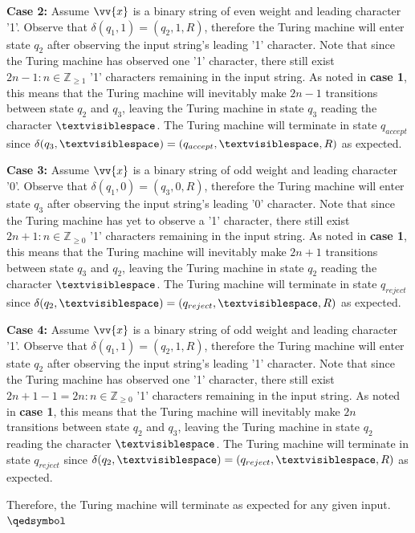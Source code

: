 \documentclass{article}
\begin{document}
\begin{prf}
\begin{adjustwidth}{0.5cm}{}
\end{adjustwidth}
\begin{adjustwidth}{0.5cm}{}
	\textbf{Case 2:} Assume $\vv{x}$ is a binary string of even weight and leading character '1'.  Observe that $\delta(q_{1}, 1) = (q_{2}, 1, R)$, therefore the Turing machine will enter state $q_{2}$ after observing the input string's leading '1' character.  Note that since the Turing machine has observed one '1' character, there still exist $2n - 1 : n \in \mathbb{Z}_{\geq 1}$ '1' characters remaining in the input string.  As noted in \textbf{case 1}, this means that the Turing machine will inevitably make $2n - 1$ transitions between state $q_{2}$ and $q_{3}$, leaving the Turing machine in state $q_{3}$ reading the character $\textvisiblespace$.  The Turing machine will terminate in state $q_{accept}$ since $\delta(q_{3}, \textvisiblespace) = (q_{accept}, \textvisiblespace, R)$ as expected.\\
\end{adjustwidth}
\begin{adjustwidth}{0.5cm}{}
	\textbf{Case 3:} Assume $\vv{x}$ is a binary string of odd weight and leading character '0'.  Observe that $\delta(q_{1}, 0) = (q_{3}, 0, R)$, therefore the Turing machine will enter state $q_{3}$ after observing the input string's leading '0' character.  Note that since the Turing machine has yet to observe a '1' character, there still exist $2n + 1 : n \in \mathbb{Z}_{\geq 0}$ '1' characters remaining in the input string.  As noted in \textbf{case 1}, this means that the Turing machine will inevitably make $2n + 1$ transitions between state $q_{3}$ and $q_{2}$, leaving the Turing machine in state $q_{2}$ reading the character $\textvisiblespace$.  The Turing machine will terminate in state $q_{reject}$ since $\delta(q_{2}, \textvisiblespace) = (q_{reject}, \textvisiblespace, R)$ as expected.\\
\end{adjustwidth}
\begin{adjustwidth}{0.5cm}{}
	\textbf{Case 4:} Assume $\vv{x}$ is a binary string of odd weight and leading character '1'.  Observe that $\delta(q_{1}, 1) = (q_{2}, 1, R)$, therefore the Turing machine will enter state $q_{2}$ after observing the input string's leading '1' character.  Note that since the Turing machine has observed one '1' character, there still exist $2n + 1 - 1 = 2n : n \in \mathbb{Z}_{\geq 0}$ '1' characters remaining in the input string.  As noted in \textbf{case 1}, this means that the Turing machine will inevitably make $2n$ transitions between state $q_{2}$ and $q_{3}$, leaving the Turing machine in state $q_{2}$ reading the character $\textvisiblespace$.  The Turing machine will terminate in state $q_{reject}$ since $\delta(q_{2}, \textvisiblespace) = (q_{reject}, \textvisiblespace, R)$ as expected. \\
\end{adjustwidth}
	\noindent Therefore, the Turing machine will terminate as expected for any given input. $\qedsymbol$
\end{prf}
\end{document}

